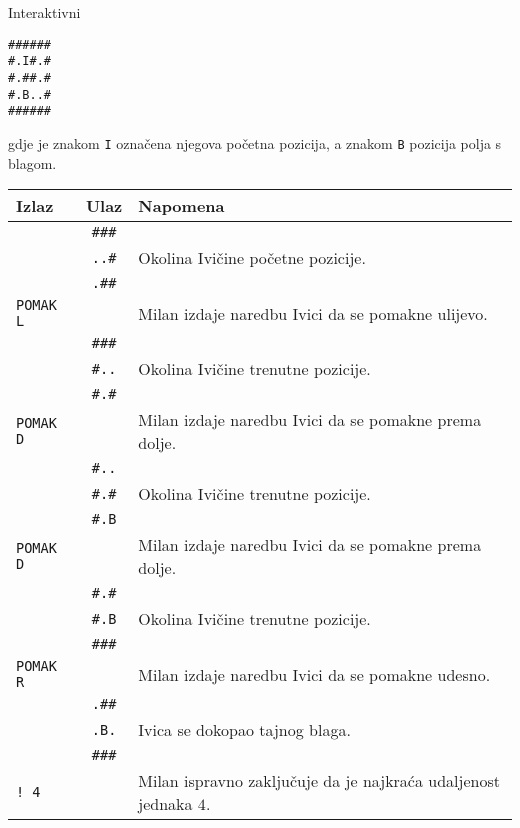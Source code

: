 \begin{statement}[
  problempoints=100,
  timelimit=5 sekundi,
  memorylimit=512 MiB,
]{Interaktivni}
\begin{centering}
\texttt{\#\#\#\#\#\#}\\
\texttt{\#.I\#.\#}\\
\texttt{\#.\#\#.\#}\\
\texttt{\#.B..\#}\\
\texttt{\#\#\#\#\#\#}\\
\end{centering}

gdje je znakom \texttt{I} označena njegova početna pozicija, a znakom \texttt{B}
pozicija polja s blagom.\\

{\renewcommand{\arraystretch}{1}
  \setlength{\tabcolsep}{6pt}
  \begin{tabular}{lcl}
    Izlaz & Ulaz & Napomena \\ \midrule
      & \texttt{\#\#\#} & \\
      & \texttt{..\#} & Okolina Ivičine početne pozicije. \\
      & \texttt{.\#\#} & \\
    \texttt{POMAK L} & & Milan izdaje naredbu Ivici da se pomakne ulijevo. \\
      & \texttt{\#\#\#} & \\
      & \texttt{\#..} & Okolina Ivičine trenutne pozicije. \\
      & \texttt{\#.\#} & \\
    \texttt{POMAK D} & & Milan izdaje naredbu Ivici da se pomakne prema dolje. \\
      & \texttt{\#..} & \\
      & \texttt{\#.\#} & Okolina Ivičine trenutne pozicije. \\
      & \texttt{\#.B} & \\
    \texttt{POMAK D} & & Milan izdaje naredbu Ivici da se pomakne prema dolje. \\
      & \texttt{\#.\#} & \\
      & \texttt{\#.B} & Okolina Ivičine trenutne pozicije. \\
      & \texttt{\#\#\#} & \\
    \texttt{POMAK R} & & Milan izdaje naredbu Ivici da se pomakne udesno. \\
      & \texttt{.\#\#} & \\
      & \texttt{.B.} & Ivica se dokopao tajnog blaga. \\
      & \texttt{\#\#\#} & \\
    \texttt{\frenchspacing! 4} & & Milan ispravno zaključuje da je najkraća udaljenost jednaka $4$. \\
\end{tabular}}

\end{statement}

